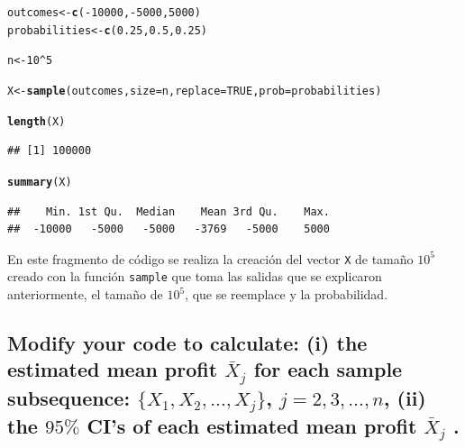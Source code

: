 \documentclass[12pt]{article}\usepackage[]{graphicx}\usepackage[]{xcolor}
\makeatletter
\newcommand{\hlnum}[1]{\textcolor[rgb]{0.686,0.059,0.569}{#1}}%
\newcommand{\hlopt}[1]{\textcolor[rgb]{0,0,0}{#1}}%
\newcommand{\hldef}[1]{\textcolor[rgb]{0.345,0.345,0.345}{#1}}%
\newcommand{\hlkwb}[1]{\textcolor[rgb]{0.69,0.353,0.396}{#1}}%
\newcommand{\hlkwc}[1]{\textcolor[rgb]{0.333,0.667,0.333}{#1}}%
\newcommand{\hlkwd}[1]{\textcolor[rgb]{0.737,0.353,0.396}{\textbf{#1}}}%
\newenvironment{kframe}{%
 \def\at@end@of@kframe{}%
 \ifinner\ifhmode%
  \def\at@end@of@kframe{\end{minipage}}%
  \begin{minipage}{\columnwidth}%
 \fi\fi%
 \def\FrameCommand##1{\hskip\@totalleftmargin \hskip-\fboxsep
 \colorbox{shadecolor}{##1}\hskip-\fboxsep
     \hskip-\linewidth \hskip-\@totalleftmargin \hskip\columnwidth}%
 \MakeFramed {\advance\hsize-\width
   \@totalleftmargin\z@ \linewidth\hsize
   \@setminipage}}%
 {\par\unskip\endMakeFramed%
 \at@end@of@kframe}
\newenvironment{knitrout}{}{} %
\makeatother
\begin{document}
\begin{knitrout}
\color{fgcolor}\begin{kframe}
\begin{alltt}
\hldef{outcomes} \hlkwb{<-} \hlkwd{c}\hldef{(}\hlopt{-}\hlnum{10000}\hldef{,} \hlopt{-}\hlnum{5000}\hldef{,} \hlnum{5000}\hldef{)}
\hldef{probabilities} \hlkwb{<-} \hlkwd{c}\hldef{(}\hlnum{0.25}\hldef{,} \hlnum{0.5}\hldef{,} \hlnum{0.25}\hldef{)}

\hldef{n} \hlkwb{<-} \hlnum{10}\hlopt{^}\hlnum{5}

\hldef{X} \hlkwb{<-} \hlkwd{sample}\hldef{(outcomes,} \hlkwc{size} \hldef{= n ,} \hlkwc{replace} \hldef{=} \hlnum{TRUE}\hldef{,} \hlkwc{prob} \hldef{= probabilities)}

\hlkwd{length}\hldef{(X)}
\end{alltt}
\begin{verbatim}
## [1] 100000
\end{verbatim}
\begin{alltt}
\hlkwd{summary}\hldef{(X)}
\end{alltt}
\begin{verbatim}
##    Min. 1st Qu.  Median    Mean 3rd Qu.    Max. 
##  -10000   -5000   -5000   -3769   -5000    5000
\end{verbatim}
\end{kframe}
\end{knitrout}

En este fragmento de código se realiza la creación del vector \lstinline|X| de tamaño $10^{5}$ creado con la función \lstinline|sample| que toma las salidas que se explicaron anteriormente, el tamaño de $10^{5}$, que se reemplace y la probabilidad.


\subsection{Modify your code to calculate: (i) the estimated mean profit $\bar{X}_{j}$ for each sample subsequence: $\{X_{1}, X_{2}, . . . , X_{j} \}$, $j = 2, 3, \dots, n$, (ii) the $95 \%$ CI’s of each estimated mean profit $\bar{X}_{j}$ .}
\end{document}
